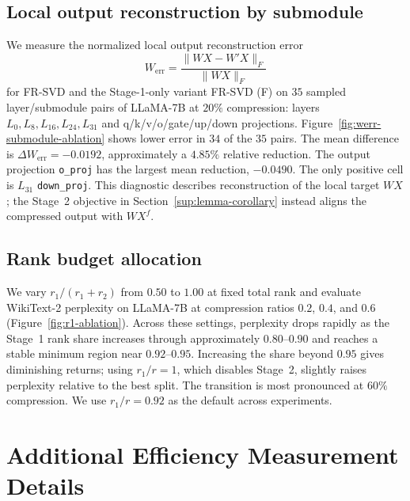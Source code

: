 

\subsection{Local output reconstruction by submodule}\label{app:submodule-reconstruction}
We measure the normalized local output reconstruction error
\begin{equation}
W_{\mathrm{err}}=\frac{\|WX-W'X\|_F}{\|WX\|_F}
\label{eq:app-werr}
\end{equation}
for FR-SVD and the Stage-1-only variant FR-SVD (F) on $35$ sampled layer/submodule pairs of LLaMA-7B at $20\%$ compression: layers $L_0,L_8,L_{16},L_{24},L_{31}$ and q/k/v/o/gate/up/down projections. Figure~\ref{fig:werr-submodule-ablation} shows lower error in $34$ of the $35$ pairs. The mean difference is $\Delta W_{\mathrm{err}}=-0.0192$, approximately a $4.85\%$ relative reduction. The output projection \texttt{o\_proj} has the largest mean reduction, $-0.0490$. The only positive cell is $L_{31}$ \texttt{down\_proj}. This diagnostic describes reconstruction of the local target $WX$; the Stage~2 objective in Section~\ref{sup:lemma-corollary} instead aligns the compressed output with $WX^f$.



\subsection{Rank budget allocation}\label{app:rank-allocation}
We vary $r_1/(r_1+r_2)$ from $0.50$ to $1.00$ at fixed total rank and evaluate WikiText-2 perplexity on LLaMA-7B at compression ratios $0.2$, $0.4$, and $0.6$ (Figure~\ref{fig:r1-ablation}). Across these settings, perplexity drops rapidly as the Stage~1 rank share increases through approximately $0.80$--$0.90$ and reaches a stable minimum region near $0.92$--$0.95$. Increasing the share beyond $0.95$ gives diminishing returns; using $r_1/r=1$, which disables Stage~2, slightly raises perplexity relative to the best split. The transition is most pronounced at $60\%$ compression. We use $r_1/r=0.92$ as the default across experiments.



\section{Additional Efficiency Measurement Details}\label{app:efficiency}

